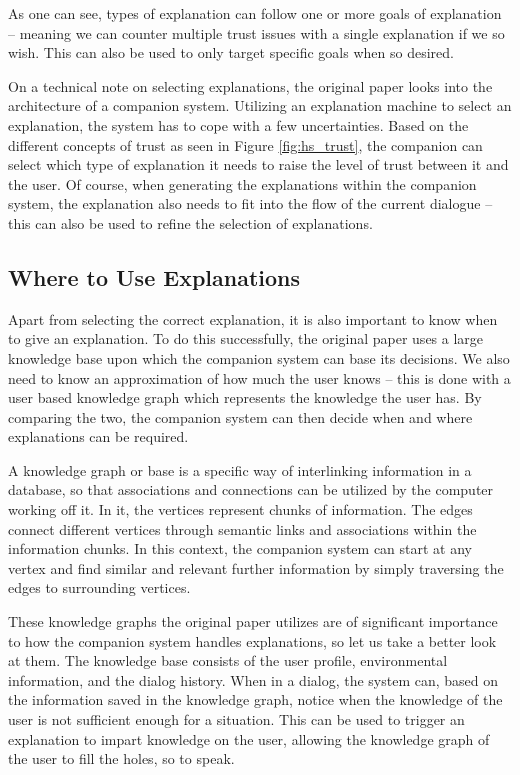 \documentclass[a4paper]{article}
\begin{document}
As one can see, types of explanation can follow one or more goals of explanation – meaning we can counter multiple trust issues with a single explanation if we so wish. This can also be used to only target specific goals when so desired.

On a technical note on selecting explanations, the original paper looks into the architecture of a companion system. Utilizing an explanation machine to select an explanation, the system has to cope with a few uncertainties. Based on the different concepts of trust as seen in Figure \ref{fig:hs_trust}, the companion can select which type of explanation it needs to raise the level of trust between it and the user. Of course, when generating the explanations within the companion system, the explanation also needs to fit into the flow of the current dialogue – this can also be used to refine the selection of explanations.

\subsection{Where to Use Explanations}
\label{know_graph}

Apart from selecting the correct explanation, it is also important to know when to give an explanation. To do this successfully, the original paper uses a large knowledge base upon which the companion system can base its decisions. We also need to know an approximation of how much the user knows – this is done with a user based knowledge graph which represents the knowledge the user has. By comparing the two, the companion system can then decide when and where explanations can be required.

A knowledge graph or base is a specific way of interlinking information in a database, so that associations and connections can be utilized by the computer working off it. In it, the vertices represent chunks of information. The edges connect different vertices through semantic links and associations within the information chunks. In this context, the companion system can start at any vertex and find similar and relevant further information by simply traversing the edges to surrounding vertices.

These knowledge graphs the original paper utilizes are of significant importance to how the companion system handles explanations, so let us take a better look at them. The knowledge base consists of the user profile, environmental information, and the dialog history. When in a dialog, the system can, based on the information saved in the knowledge graph, notice when the knowledge of the user is not sufficient enough for a situation. This can be used to trigger an explanation to impart knowledge on the user, allowing the knowledge graph of the user to fill the holes, so to speak.
\end{document}
